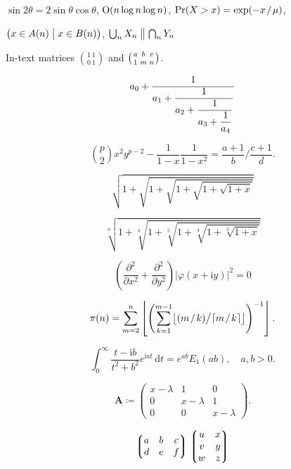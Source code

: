 \documentclass[11pt, a4paper, oneside]{article}
\newcommand{\mathup}[1]{\mathrm{#1}}
\newcommand*{\divslash}{%
	\mathbin{%
		\nonscript\mskip-2mu / \nonscript\mskip-2mu%
	}%
}  %
\theoremstyle{Plain}
\theoremstyle{Definition}
\theoremstyle{Remark}
\begin{document}
\begin{appendix}
	\noindent $\sin2\theta=2\sin\theta\cos\theta$, \quad
	$\hbox{O}(n\log n\log n)$, \quad
	$\Pr(X>x)=\exp(-x \divslash \mu)$,

	\noindent $\bigl(x\in A(n)\bigm|x\in B(n)\bigr)$, \quad
	$\bigcup_n X_n\bigm\|\bigcap_n Y_n$


	\noindent In-text matrices $\binom{1\ 1}{0\ 1}$ and $\bigl(\genfrac{}{}{0pt}{}{a}{1}\genfrac{}{}{0pt}{}{b}{m}\genfrac{}{}{0pt}{}{c}{n}\bigr)$.


	$$a_0+\frac1{\displaystyle a_1 +
		{\strut \frac1{\displaystyle a_2 +
				{\strut \frac1{\displaystyle a_3 +
						{\strut \frac1{\displaystyle a_4}}}}}}}$$


	$$\binom{p}{2}x^2y^{p-2} - \frac1{1 - x}\frac{1}{1 - x^2}
	=
	\frac{a+1}{b}\bigg/\frac{c+1}{d}.$$


	$$\sqrt{1+\sqrt{1+\sqrt{1+\sqrt{1+\sqrt{1+x}}}}}$$

	$$\sqrt[n]{1+\sqrt[k]{1+\sqrt[5]{1+\sqrt[4]{1+\sqrt[3]{1+x}}}}}$$


	$$\left(\frac{\partial^2}{\partial x^2} + \frac{\partial^2}{\partial y^2}\right)
	\bigl|\varphi(x+\mathup{i}y)\bigr|^2=0$$



	$$\pi(n)=\sum_{m=2}^n\left\lfloor\Biggl(\sum_{k=1}^{m-1}\bigl
	\lfloor(m \divslash k) \big/ \lceil m \divslash k\rceil\bigr\rfloor\Biggr)^{-1}\right\rfloor.$$


	$$\int_0^\infty \frac{t - \mathup{i} b}{t^2 + b^2}e^{\mathup{i}at}\,\mathup{d}t=e^{ab}E_1(ab), \quad
	a,b > 0.$$


	$$\mathbf{A} \coloneq \begin{pmatrix}x-\lambda&1&0\\
	0&x-\lambda&1\\
	0&0&x-\lambda\end{pmatrix}.$$

	$$\left\lgroup\begin{matrix}a&b&c\\ d&e&f\\\end{matrix}\right\rgroup
	\left\lgroup\begin{matrix}u&x\cr v&y\cr w&z\end{matrix}\right\rgroup$$


\end{appendix}
\end{document}

